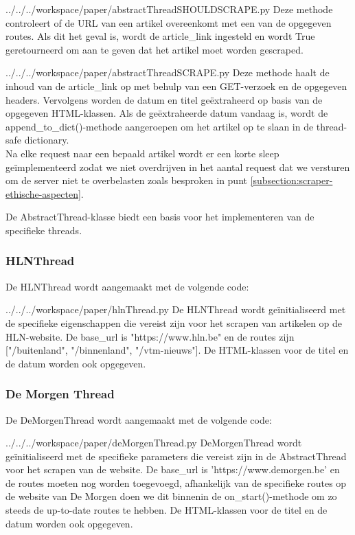 \begin{pythoncode}{../../../workspace/paper/abstractThreadSHOULDSCRAPE.py}
Deze methode controleert of de URL van een artikel overeenkomt met een van de opgegeven routes. Als dit het geval is, wordt de article\_link ingesteld en wordt True geretourneerd om aan te geven dat het artikel moet worden gescraped.
\end{pythoncode}

\begin{pythoncode}{../../../workspace/paper/abstractThreadSCRAPE.py}
    Deze methode haalt de inhoud van de article\_link op met behulp van een GET-verzoek en de opgegeven headers. Vervolgens worden de datum en titel geëxtraheerd op basis van de opgegeven HTML-klassen. Als de geëxtraheerde datum vandaag is, wordt de append\_to\_dict()-methode aangeroepen om het artikel op te slaan in de thread-safe dictionary. \\
    
    Na elke request naar een bepaald artikel wordt er een korte sleep geïmplementeerd zodat we niet overdrijven in het aantal request dat we versturen om de server niet te overbelasten zoals besproken in punt \ref{subsection:scraper-ethische-aspecten}. \\
\end{pythoncode}

De AbstractThread-klasse biedt een basis voor het implementeren van de specifieke threads.

\subsubsection{HLNThread}
    De HLNThread wordt aangemaakt met de volgende code:
    
\begin{pythoncode}{../../../workspace/paper/hlnThread.py}
    De HLNThread wordt geïnitialiseerd met de specifieke eigenschappen die vereist zijn voor het scrapen van artikelen op de HLN-website. De base\_url is "https://www.hln.be" en de routes zijn ["/buitenland", "/binnenland", "/vtm-nieuws"]. De HTML-klassen voor de titel en de datum worden ook opgegeven.
\end{pythoncode}

\subsubsection{De Morgen Thread}
    De DeMorgenThread wordt aangemaakt met de volgende code:

\begin{pythoncode}{../../../workspace/paper/deMorgenThread.py}
    DeMorgenThread wordt geïnitialiseerd met de specifieke parameters die vereist zijn in de AbstractThread voor het scrapen van de website. De base\_url is 'https://www.demorgen.be' en de routes moeten nog worden toegevoegd, afhankelijk van de specifieke routes op de website van De Morgen doen we dit binnenin de on\_start()-methode om zo steeds de up-to-date routes te hebben. De HTML-klassen voor de titel en de datum worden ook opgegeven.
\end{pythoncode}

